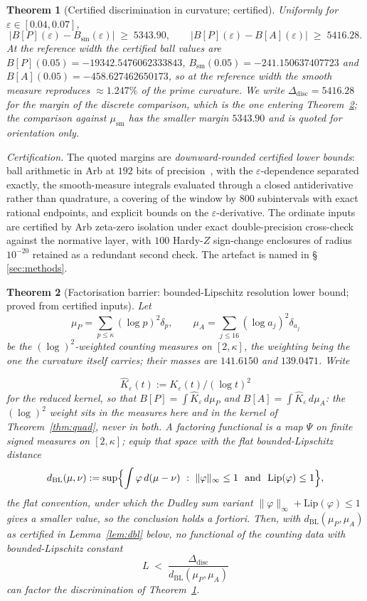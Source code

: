 \documentclass[11pt]{article}
\newtheorem{theorem}{Theorem}[section]
\newcommand{\dBL}{d_{\mathrm{BL}}}              %
\newcommand{\Ddisc}{\Delta_{\mathrm{disc}}}     %
\newcommand{\Bsm}{B_{\mathrm{sm}}}              %
\begin{document}
\begin{theorem}[Certified discrimination in curvature; certified]
\label{thm:disc}
Uniformly for $\varepsilon\in[0.04,0.07]$,
\[
|B[P](\varepsilon)-\Bsm(\varepsilon)|\;\ge\;5343.90,
\qquad
|B[P](\varepsilon)-B[A](\varepsilon)|\;\ge\;5416.28 .
\]
At the reference width the certified ball values are
$B[P](0.05)=-19342.5476062333843$, $\Bsm(0.05)=-241.150637407723$ and
$B[A](0.05)=-458.627462650173$, so at the reference width the smooth measure reproduces
$\approx1.247\%$ of the prime curvature. We write $\Ddisc=5416.28$ for the margin of the discrete comparison, which is
the one entering Theorem~\ref{thm:fact}; the comparison against
$\mu_{\mathrm{sm}}$ has the smaller margin $5343.90$ and is quoted for
orientation only.
\end{theorem}

\emph{Certification.} The quoted margins are \emph{downward-rounded
certified lower bounds}: ball arithmetic in Arb at $192$ bits of
precision~\cite{Johansson17}, with the $\varepsilon$-dependence separated
exactly, the smooth-measure integrals evaluated through a closed
antiderivative rather than quadrature, a covering of the window by $800$
subintervals with exact rational endpoints, and explicit bounds on the
$\varepsilon$-derivative. The ordinate inputs are certified by Arb
zeta-zero isolation under exact double-precision cross-check against the
normative layer, with $100$ Hardy-$Z$ sign-change enclosures of radius
$10^{-20}$ retained as a redundant second check.
The artefact is named in \S\,\ref{sec:methods}.

\begin{theorem}[Factorisation barrier: bounded-Lipschitz resolution lower
bound; proved from certified inputs]
\label{thm:fact}
Let
\[
\mu_P=\sum_{p\le\kappa}(\log p)^2\delta_p,
\qquad
\mu_A=\sum_{j\le16}(\log a_j)^2\delta_{a_j}
\]
be the $(\log)^2$-weighted
counting measures on $[2,\kappa]$, the weighting being the one the curvature
itself carries; their masses are $141.6150$ and $139.0471$. Write

\[
\hat K_\varepsilon(t):=K_\varepsilon(t)/(\log t)^2
\]
 for the reduced kernel,
so that $B[P]=\int\hat K_\varepsilon\,d\mu_P$ and
$B[A]=\int\hat K_\varepsilon\,d\mu_A$: the $(\log)^2$ weight sits in the
measures here and in the kernel of Theorem~\ref{thm:quad}, never in both. A
factoring functional is a map $\Psi$ on finite signed measures on
$[2,\kappa]$; equip that space with the flat bounded-Lipschitz distance
\[
\dBL(\mu,\nu):=\sup\Bigl\{\int\varphi\,d(\mu-\nu)\ :\
\|\varphi\|_\infty\le 1\ \text{ and }\ \mathrm{Lip}(\varphi)\le 1\Bigr\},
\]
the flat convention, under which the Dudley sum variant
$\|\varphi\|_\infty+\mathrm{Lip}(\varphi)\le1$ gives a smaller value, so the
conclusion holds a fortiori. Then, with $\dBL(\mu_P,\mu_A)$ as certified in
Lemma~\ref{lem:dbl} below, no functional of the counting data with
bounded-Lipschitz constant
\[
L\;<\;\frac{\Ddisc}{\dBL(\mu_P,\mu_A)}
\]
can factor the discrimination of Theorem~\ref{thm:disc}.
\end{theorem}
\end{document}
